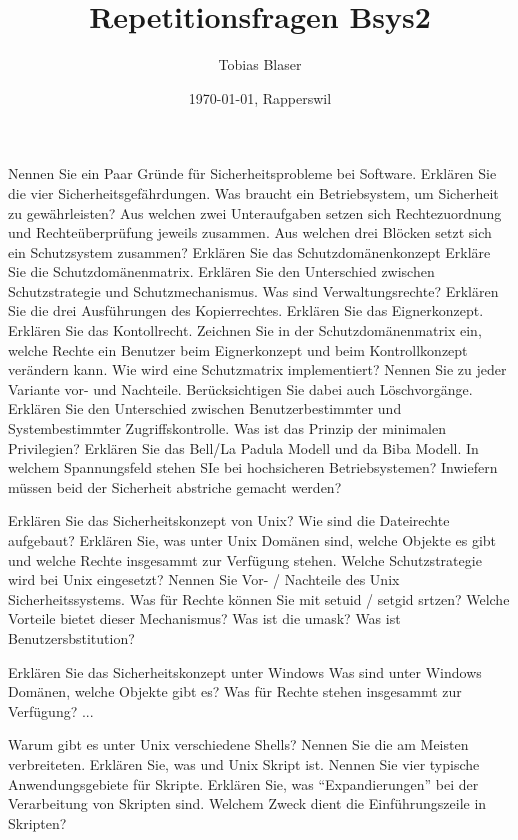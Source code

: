 \documentclass[ngerman,a4paper,12pt]{scrreprt}
\title{Repetitionsfragen Bsys2}
\author{Tobias Blaser}
\date{\today{}, Rapperswil}
\begin{document}
\tableofcontents
\clearpage


\ol
	\li Nennen Sie ein Paar Gründe für Sicherheitsprobleme bei Software.
	\li Erklären Sie die vier Sicherheitsgefährdungen.
	\li Was braucht ein Betriebsystem, um Sicherheit zu gewährleisten?
	\li Aus welchen zwei Unteraufgaben setzen sich Rechtezuordnung und Rechteüberprüfung jeweils zusammen.
	\li Aus welchen drei Blöcken setzt sich ein Schutzsystem zusammen?
	\li Erklären Sie das Schutzdomänenkonzept
	\li Erkläre Sie die Schutzdomänenmatrix.
	\li Erklären Sie den Unterschied zwischen Schutzstrategie und Schutzmechanismus.
	\li Was sind Verwaltungsrechte?
	\li Erklären Sie die drei Ausführungen des Kopierrechtes.
	\li Erklären Sie das Eignerkonzept.
	\li Erklären Sie das Kontollrecht.
	\li Zeichnen Sie in der Schutzdomänenmatrix ein, welche Rechte ein Benutzer beim Eignerkonzept und beim Kontrollkonzept verändern kann.
	\li Wie wird eine Schutzmatrix implementiert? Nennen Sie zu jeder Variante vor- und Nachteile. Berücksichtigen Sie dabei auch Löschvorgänge.
	\li Erklären Sie den Unterschied zwischen Benutzerbestimmter und Systembestimmter Zugriffskontrolle.
	\li Was ist das Prinzip der minimalen Privilegien?
	\li Erklären Sie das Bell/La Padula Modell und da Biba Modell.
	\li In welchem Spannungsfeld stehen SIe bei hochsicheren Betriebsystemen? Inwiefern müssen beid der Sicherheit abstriche gemacht werden?
\olS

\olR
	\li Erklären Sie das Sicherheitskonzept von Unix? Wie sind die Dateirechte aufgebaut?
	\li Erklären Sie, was unter Unix Domänen sind, welche Objekte es gibt und welche Rechte insgesammt zur Verfügung stehen.
	\li Welche Schutzstrategie wird bei Unix eingesetzt?
	\li Nennen Sie Vor- / Nachteile des Unix Sicherheitssystems.
	\li Was für Rechte können Sie mit setuid / setgid srtzen? Welche Vorteile bietet dieser Mechanismus?
	\li Was ist die umask?
	\li Was ist Benutzersbstitution?
\olS

\olR
	\li Erklären Sie das Sicherheitskonzept unter Windows
	\li Was sind unter Windows Domänen, welche Objekte gibt es? Was für Rechte stehen insgesammt zur Verfügung?
	\li ...
	
\olS


\olR
	\li Warum gibt es unter Unix verschiedene Shells? Nennen Sie die am Meisten verbreiteten.
	\li Erklären Sie, was und Unix Skript ist.
	\li Nennen Sie vier typische Anwendungsgebiete für Skripte.
	\li Erklären Sie, was ``Expandierungen'' bei der Verarbeitung von Skripten sind.
	\li Welchem Zweck dient die Einführungszeile in Skripten?
\olS
\end{document}
